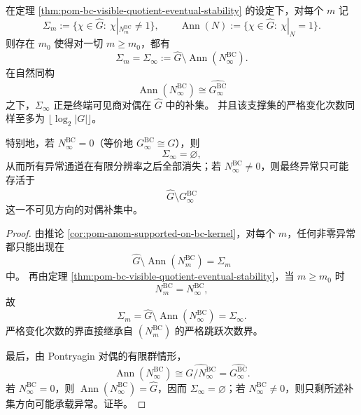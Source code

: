 \begin{corollary}[异常字符支撑在有限分辨率后冻结]\label{cor:pom-bc-anomaly-character-support-eventual-freezing}
在定理 \ref{thm:pom-bc-visible-quotient-eventual-stability} 的设定下，对每个 \(m\) 记
\[
\Sigma_m:=\{\chi\in\widehat G:\ \chi|_{N_m^{\mathrm{BC}}}\neq 1\},
\qquad
\operatorname{Ann}(N):=\{\chi\in\widehat G:\ \chi|_N=1\}.
\]
则存在 \(m_0\) 使得对一切 \(m\ge m_0\)，都有
\[
\Sigma_m=\Sigma_\infty
:=
\widehat G\setminus \operatorname{Ann}(N_\infty^{\mathrm{BC}}).
\]
在自然同构
\[
\operatorname{Ann}(N_\infty^{\mathrm{BC}})
\cong
\widehat{G_\infty^{\mathrm{BC}}}
\]
之下，\(\Sigma_\infty\) 正是终端可见商对偶在 \(\widehat G\) 中的补集。
并且该支撑集的严格变化次数同样至多为 \(\lfloor \log_2|G|\rfloor\)。

特别地，若 \(N_\infty^{\mathrm{BC}}=0\)（等价地 \(G_\infty^{\mathrm{BC}}\cong G\)），则
\[
\Sigma_\infty=\varnothing,
\]
从而所有异常通道在有限分辨率之后全部消失；若 \(N_\infty^{\mathrm{BC}}\neq 0\)，则最终异常只可能存活于
\[
\widehat G\setminus \widehat{G_\infty^{\mathrm{BC}}}
\]
这一不可见方向的对偶补集中。
\end{corollary}
\begin{proof}
由推论 \ref{cor:pom-anom-supported-on-bc-kernel}，对每个 \(m\)，任何非零异常都只能出现在
\[
\widehat G\setminus \operatorname{Ann}(N_m^{\mathrm{BC}})
=
\Sigma_m
\]
中。
再由定理 \ref{thm:pom-bc-visible-quotient-eventual-stability}，当 \(m\ge m_0\) 时
\[
N_m^{\mathrm{BC}}=N_\infty^{\mathrm{BC}},
\]
故
\[
\Sigma_m=\widehat G\setminus \operatorname{Ann}(N_\infty^{\mathrm{BC}})
=\Sigma_\infty.
\]
严格变化次数的界直接继承自
\((N_m^{\mathrm{BC}})\) 的严格跳跃次数界。

最后，由 Pontryagin 对偶的有限群情形，
\[
\operatorname{Ann}(N_\infty^{\mathrm{BC}})
\cong
\widehat{G/N_\infty^{\mathrm{BC}}}
=
\widehat{G_\infty^{\mathrm{BC}}}.
\]
若 \(N_\infty^{\mathrm{BC}}=0\)，则 \(\operatorname{Ann}(N_\infty^{\mathrm{BC}})=\widehat G\)，因而 \(\Sigma_\infty=\varnothing\)；若 \(N_\infty^{\mathrm{BC}}\neq 0\)，则只剩所述补集方向可能承载异常。证毕。
\end{proof}

\endinput

